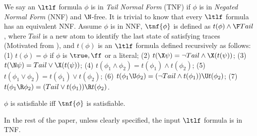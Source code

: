 We say an $\ltlf$ formula $\phi$ is in \emph{Tail Normal Form} (TNF) if $\phi$ is in \emph{Negated Normal Form} (NNF) and $\N$-free. 
It is trivial to know that every $\ltlf$ formula 
has an equivalent NNF. Assume $\phi$ is in NNF, $\tnf{\phi}$ is defined as $t(\phi)\wedge \F Tail$, where $Tail$ 
is a new atom to identify the last state of satisfying traces (Motivated from \cite{GV13}), and $t(\phi)$ is an $\ltlf$ formula defined recursively as follows: (1) $t(\phi) = \phi$ if $\phi$ is $\true,\ff$ or a literal; 
(2) $t(\X\psi) = \neg Tail \wedge \X (t(\psi))$; (3) $t(\N\psi) = Tail\vee \X(t(\psi))$; (4) $t(\phi_1\wedge\phi_2) = t(\phi_1)\wedge t(\phi_2)$; (5) $t(\phi_1\vee\phi_2) = t(\phi_1)\vee t(\phi_2)$; (6) $t(\phi_1 \U\phi_2) = (\neg Tail\wedge t(\phi_1)) \U t(\phi_2)$; (7) $t(\phi_1 \R\phi_2) = (Tail\vee t(\phi_1)) \R t(\phi_2)$. 


\begin{theorem}\label{thm:tnf}
    $\phi$ is satisfiable iff $\tnf{\phi}$ is satisfiable.
\end{theorem}
\iffalse
\begin{proof}
(Sketch.) Let $\xi,\xi'$ be two non-empty finite traces satisfying $|\xi| = |\xi'|$ and $\xi'[i] = \xi[i]$ for $0\leq i< |\xi|-1$ as well as $\xi'[|\xi|-1] = \xi[|\xi|-1]\cup\{Tail\}$. We can prove by induction over the type of $\phi$ that $\xi\models\phi$ iff $\xi'\models\tnf{\phi}$. For the ($\Leftarrow$) direction, we complement the proof that $\tnf{\phi}$ is satisfiable implies there is such a $\xi'$ that $\xi'\models\tnf{\phi}$. 
\end{proof}
\fi

In the rest of the paper, unless clearly specified, the input $\ltlf$ formula is in TNF. 


